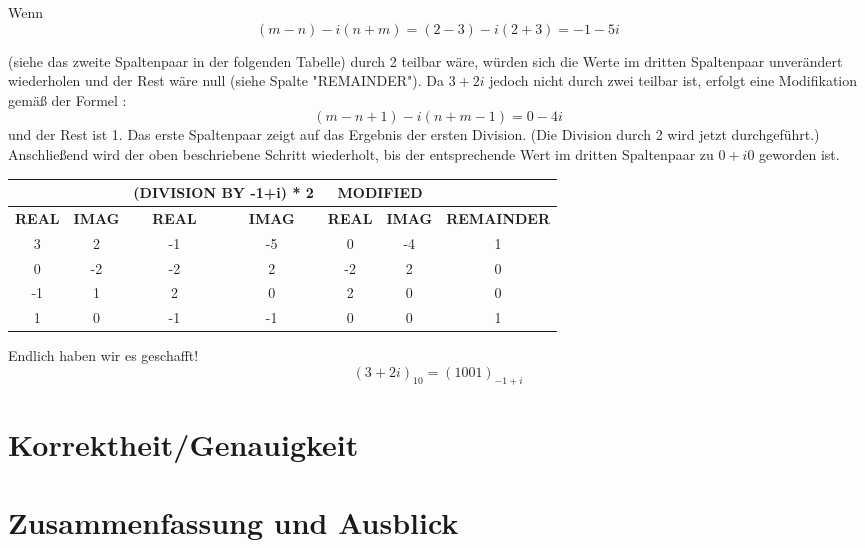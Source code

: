 \documentclass[course=erap]{aspdoc}
\begin{document}
Wenn
\[(m - n) - i(n+m)=(2-3) - i(2 + 3) = -1 - 5i\] 

(siehe das zweite Spaltenpaar in der folgenden Tabelle) durch 2 teilbar wäre, würden sich die Werte im dritten Spaltenpaar unverändert wiederholen und der Rest wäre null (siehe Spalte "REMAINDER"). Da $3 + 2 i$ jedoch nicht durch zwei teilbar ist, erfolgt eine Modifikation gemäß der Formel :
\[(m - n + 1) - i(n + m - 1)= 0 - 4  i\] 
und der Rest ist 1. Das erste Spaltenpaar zeigt auf das Ergebnis der ersten Division. (Die Division durch 2 wird jetzt durchgeführt.) Anschließend wird der oben beschriebene Schritt wiederholt, bis der entsprechende Wert im dritten Spaltenpaar zu $0 + i0$ geworden ist.
\\

\begin{table}[!ht]
\centering
\begin{tabular}{|c|c|cc|cc|c|}
\hline
              &               & \multicolumn{2}{c|}{\textbf{(DIVISION BY -1+i) * 2}} & \multicolumn{2}{c|}{\textbf{MODIFIED}}             &                    \\ \hline
\textbf{REAL} & \textbf{IMAG} & \multicolumn{1}{c|}{\textbf{REAL}}  & \textbf{IMAG}  & \multicolumn{1}{c|}{\textbf{REAL}} & \textbf{IMAG} & \textbf{REMAINDER} \\ \hline
3             & 2             & \multicolumn{1}{c|}{-1}             & -5             & \multicolumn{1}{c|}{0}             & -4            & 1                  \\ \hline
0             & -2            & \multicolumn{1}{c|}{-2}             & 2              & \multicolumn{1}{c|}{-2}            & 2             & 0                  \\ \hline
-1            & 1             & \multicolumn{1}{c|}{2}              & 0              & \multicolumn{1}{c|}{2}             & 0             & 0                  \\ \hline
1             & 0             & \multicolumn{1}{c|}{-1}             & -1             & \multicolumn{1}{c|}{0}             & 0             & 1                  \\ \hline
\end{tabular}
\end{table}

Endlich haben wir es geschafft! 
\[(3 + 2i)_{10} = (1001)_{-1+i}\]









\section{Korrektheit/Genauigkeit}

\section{Zusammenfassung und Ausblick}


{}
\end{document}
